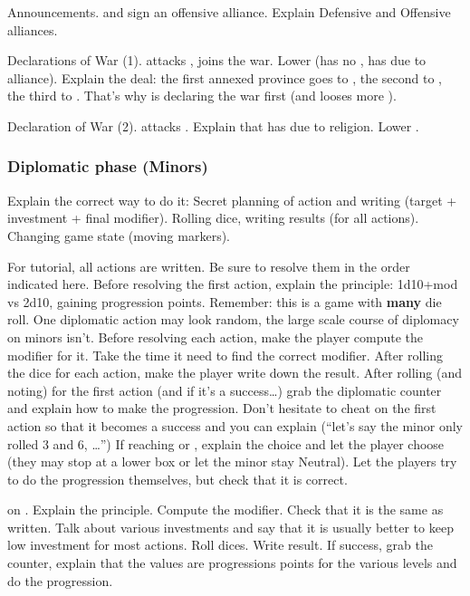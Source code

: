 \aparag Announcements.
\bparag \RUS and \POL sign an offensive alliance.
\bparag Explain Defensive and Offensive alliances.

\aparag Declarations of War (1).
\bparag \RUS attacks \paysDon, \POL joins the war.
\bparag Lower \STAB (\RUS has no \CB, \POL has due to alliance).
\bparag Explain the deal: the first annexed province goes to \RUS, the second
to \paysUkraine, the third to \RUS. That's why \RUS is declaring the war
first (and looses more \STAB).

\aparag Declaration of War (2).
\bparag \TUR attacks \paysGeorgie.
\bparag Explain that \TUR has \CB due to religion. Lower \STAB.

\subsubsection{Diplomatic phase (Minors)}
\aparag Explain the correct way to do it:
\bparag Secret planning of action and writing (target + investment + final
modifier).
\bparag Rolling dice, writing results (for all actions).
\bparag Changing game state (moving markers).

\aparag For tutorial, all actions are written. Be sure to resolve them in the
order indicated here.
\bparag Before resolving the first action, explain the principle: 1d10+mod vs
2d10, gaining progression points.
\bparag Remember: this is a game with \textbf{many} die roll. One diplomatic
action may look random, the large scale course of diplomacy on minors isn't.
\bparag Before resolving each action, make the player compute the modifier for
it. Take the time it need to find the correct modifier.
\bparag After rolling the dice for each action, make the player write down the
result.
\bparag After rolling (and noting) for the first action (and if it's a
success\ldots) grab the diplomatic counter and explain how to make the
progression. Don't hesitate to cheat on the first action so that it becomes a
success and you can explain (``let's say the minor only rolled 3 and 6,
\ldots'')
\bparag If reaching \SUB or \RM, explain the choice and let the player
choose (they may stop at a lower box or let the minor stay Neutral).
\bparag Let the players try to do the progression themselves, but check that
it is correct.

\aparag \POL on \paysBrandebourg.
\bparag Explain the principle. Compute the modifier. Check that it is the same
as written.
\bparag Talk about various investments and say that it is usually better to
keep low investment for most actions.
\bparag Roll dices. Write result.
\bparag If success, grab the counter, explain that the values are progressions
points for the various levels and do the progression.

